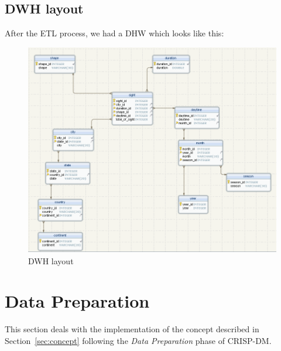 \documentclass[11pt, journal]{IEEEtran}
\begin{document}
\subsection{DWH layout}\label{subsec:DWHLayout}
After the ETL process, we had a DHW which looks like this:
\begin{figure}[htb]
	\centering
		\includegraphics[width=1.0\columnwidth]{images/CDWHUFO}
	\caption{DWH layout}
	\label{fig:CDWHlayout}
\end{figure}

 
\section{Data Preparation} \label{sec:dataPreparation}
This section deals with the implementation of the concept described in Section~\ref{sec:concept} following the \emph{Data Preparation}
phase of CRISP-DM. 
\end{document}
